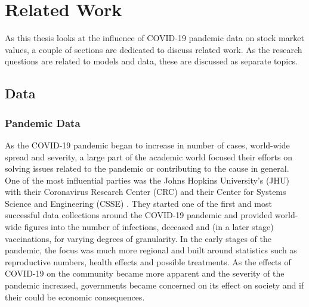 \section{Related Work}
\label{sec:rel}




As this thesis looks at the influence of COVID-19 pandemic data on stock market values, a couple of sections are dedicated to discuss related work. As the research questions are related to models and data, these are discussed as separate topics.

\subsection{Data}

\subsubsection{Pandemic Data}

As the COVID-19 pandemic began to increase in number of cases, world-wide spread and severity, a large part of the academic world focused their efforts on solving issues related to the pandemic or contributing to the cause in general. One of the most influential parties was the Johns Hopkins University's (JHU) with their Coronavirus Research Center (CRC) and their Center for Systems Science and Engineering (CSSE) \cite{dong2020interactive}. They started one of the first and most successful data collections around the COVID-19 pandemic and provided world-wide figures into the number of infections, deceased and (in a later stage) vaccinations, for varying degrees of granularity. In the early stages of the pandemic, the focus was much more regional \cite{HUANG2020497, wang2020novel, velavan2020covid} and built around statistics such as reproductive numbers, health effects and possible treatments. As the effects of COVID-19 on the community became more apparent and the severity of the pandemic increased, governments became concerned on its effect on society and if their could be economic consequences.

